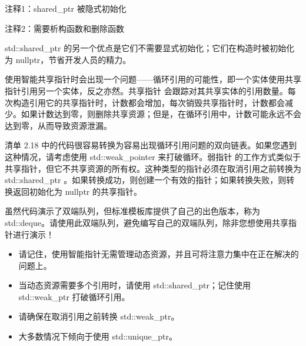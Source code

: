 {\footnotesize
注释1：shared\_ptr 被隐式初始化

注释2：需要析构函数和删除函数
}

std::shared\_ptr 的另一个优点是它们不需要显式初始化；它们在构造时被初始化为 nullptr，节省开发人员的精力。

使用智能共享指针时会出现一个问题——循环引用的可能性，即一个实体使用共享指针引用另一个实体，反之亦然。共享指针 会跟踪对其共享实体的引用数量。每次构造引用它的共享指针时，计数都会增加，每次销毁共享指针时，计数都会减少。如果计数达到零，则删除共享资源；但是，在循环引用中，计数可能永远不会达到零，从而导致资源泄漏。

清单 2.18 中的代码很容易转换为容易出现循环引用问题的双向链表。如果您遇到这种情况，请考虑使用 std::weak\_pointer 来打破循环。弱指针 的工作方式类似于共享指针，但它不共享资源的所有权。这种类型的指针必须在取消引用之前转换为 std::shared\_ptr 。如果转换成功，则创建一个有效的指针；如果转换失败，则转换返回初始化为 nullptr 的共享指针。

虽然代码演示了双端队列，但标准模板库提供了自己的出色版本，称为 std::deque。请使用此双端队列，避免编写自己的双端队列，除非您想使用共享指针进行演示！


\begin{itemize}
\item
请记住，使用智能指针无需管理动态资源，并且可将注意力集中在正在解决的问题上。

\item
当动态资源需要多个引用时，请使用 std::shared\_ptr；记住使用 std::weak\_ptr 打破循环引用。

\item
请确保在取消引用之前转换 std::weak\_ptr。

\item
大多数情况下倾向于使用 std::unique\_ptr。
\end{itemize}

































